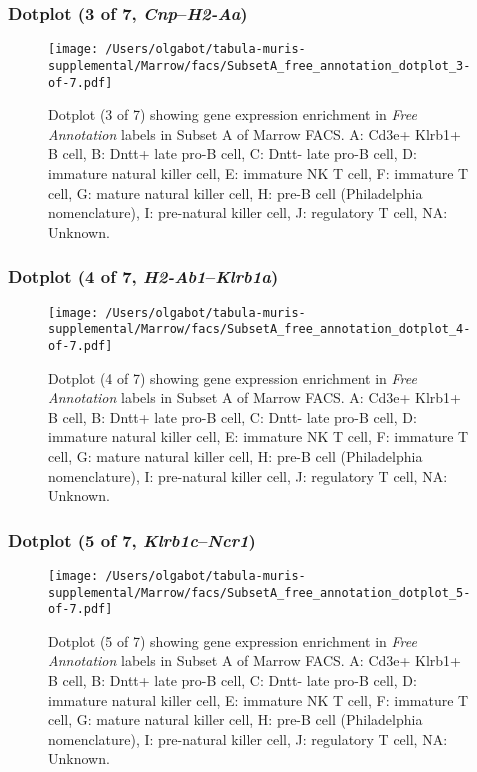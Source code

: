 \clearpage

\subsubsection{Dotplot (3 of 7, \emph{Cnp}--\emph{H2-Aa})}
\begin{figure}[h]
\centering
\texttt{[image: /Users/olgabot/tabula-muris-supplemental/Marrow/facs/SubsetA\_free\_annotation\_dotplot\_3-of-7.pdf]}

\caption{ Dotplot (3 of 7)  showing gene expression enrichment in \emph{Free Annotation} labels in Subset A of Marrow FACS. A: Cd3e+ Klrb1+ B cell, B: Dntt+ late pro-B cell, C: Dntt- late pro-B cell, D: immature natural killer cell, E: immature NK T cell, F: immature T cell, G: mature natural killer cell, H: pre-B cell (Philadelphia nomenclature), I: pre-natural killer cell, J: regulatory T cell, NA: Unknown.}
\end{figure}


\clearpage

\subsubsection{Dotplot (4 of 7, \emph{H2-Ab1}--\emph{Klrb1a})}
\begin{figure}[h]
\centering
\texttt{[image: /Users/olgabot/tabula-muris-supplemental/Marrow/facs/SubsetA\_free\_annotation\_dotplot\_4-of-7.pdf]}

\caption{ Dotplot (4 of 7)  showing gene expression enrichment in \emph{Free Annotation} labels in Subset A of Marrow FACS. A: Cd3e+ Klrb1+ B cell, B: Dntt+ late pro-B cell, C: Dntt- late pro-B cell, D: immature natural killer cell, E: immature NK T cell, F: immature T cell, G: mature natural killer cell, H: pre-B cell (Philadelphia nomenclature), I: pre-natural killer cell, J: regulatory T cell, NA: Unknown.}
\end{figure}


\clearpage

\subsubsection{Dotplot (5 of 7, \emph{Klrb1c}--\emph{Ncr1})}
\begin{figure}[h]
\centering
\texttt{[image: /Users/olgabot/tabula-muris-supplemental/Marrow/facs/SubsetA\_free\_annotation\_dotplot\_5-of-7.pdf]}

\caption{ Dotplot (5 of 7)  showing gene expression enrichment in \emph{Free Annotation} labels in Subset A of Marrow FACS. A: Cd3e+ Klrb1+ B cell, B: Dntt+ late pro-B cell, C: Dntt- late pro-B cell, D: immature natural killer cell, E: immature NK T cell, F: immature T cell, G: mature natural killer cell, H: pre-B cell (Philadelphia nomenclature), I: pre-natural killer cell, J: regulatory T cell, NA: Unknown.}
\end{figure}


